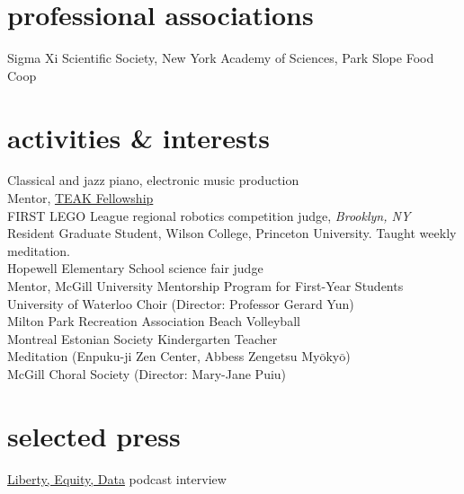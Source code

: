 \documentclass[4pt, letterpaper]{article}
\begin{document}
\section*{professional associations}
Sigma Xi Scientific Society, 
New York Academy of Sciences, Park Slope Food Coop

\section*{activities \& interests}
Classical and jazz piano, electronic music production\\
Mentor, \href{http://teakfellowship.org/}{TEAK Fellowship}\\
FIRST LEGO League regional robotics competition judge, \emph{Brooklyn, NY}\\
Resident Graduate Student, Wilson College, Princeton University. Taught weekly meditation.\\
Hopewell Elementary School science fair judge\\
Mentor, McGill University Mentorship Program for First-Year Students\\
University of Waterloo Choir (Director: Professor Gerard Yun)\\
Milton Park Recreation Association Beach Volleyball\\
Montreal Estonian Society Kindergarten Teacher\\
Meditation (Enpuku-ji Zen Center, Abbess Zengetsu My$\bar{\mbox{o}}$ky$\bar{\mbox{o}}$)\\
McGill Choral Society (Director: Mary-Jane Puiu)

\section*{selected press}
\href{https://anchor.fm/prifina/episodes/Life-or-Death---Fostering-an-Open-Health-Data-Market-e1jkg0a}{Liberty, Equity, Data} podcast interview
\end{document}
